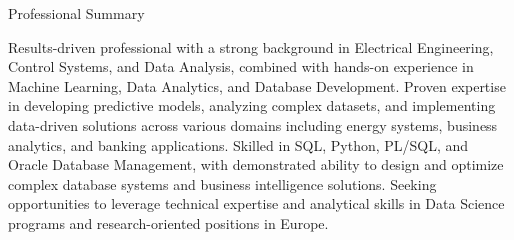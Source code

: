 \begin{rubric}{Professional Summary}

\entry*%
    Results-driven professional with a strong background in Electrical Engineering, Control Systems, and Data Analysis, combined with hands-on experience in Machine Learning, Data Analytics, and Database Development. Proven expertise in developing predictive models, analyzing complex datasets, and implementing data-driven solutions across various domains including energy systems, business analytics, and banking applications. Skilled in SQL, Python, PL/SQL, and Oracle Database Management, with demonstrated ability to design and optimize complex database systems and business intelligence solutions. Seeking opportunities to leverage technical expertise and analytical skills in Data Science programs and research-oriented positions in Europe.

\end{rubric}
